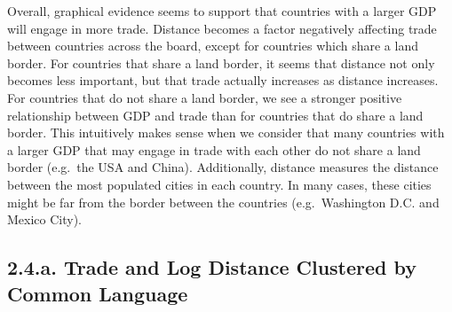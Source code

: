 \documentclass[
]{article}
\begin{document}
Overall, graphical evidence seems to support that countries with a
larger GDP will engage in more trade. Distance becomes a factor
negatively affecting trade between countries across the board, except
for countries which share a land border. For countries that share a land
border, it seems that distance not only becomes less important, but that
trade actually increases as distance increases. For countries that do
not share a land border, we see a stronger positive relationship between
GDP and trade than for countries that do share a land border. This
intuitively makes sense when we consider that many countries with a
larger GDP that may engage in trade with each other do not share a land
border (e.g.~the USA and China). Additionally, distance measures the
distance between the most populated cities in each country. In many
cases, these cities might be far from the border between the countries
(e.g.~Washington D.C. and Mexico City).

\hypertarget{a.-trade-and-log-distance-clustered-by-common-language}{%
\subsection{2.4.a. Trade and Log Distance Clustered by Common
Language}\label{a.-trade-and-log-distance-clustered-by-common-language}}
\end{document}
